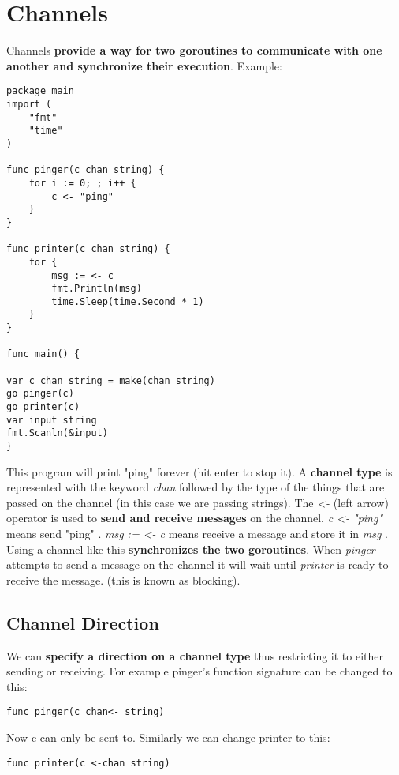 \documentclass[10pt,letterpaper]{report}
\begin{document}
\section{Channels}
Channels \textbf{provide a way for two goroutines to communicate with one another and synchronize their execution}. Example:
\begin{lstlisting}
package main
import (
	"fmt"
	"time"
)

func pinger(c chan string) {
	for i := 0; ; i++ {
		c <- "ping"
	}
}

func printer(c chan string) {
	for {
		msg := <- c
		fmt.Println(msg)
		time.Sleep(time.Second * 1)
	}
}

func main() {

var c chan string = make(chan string)
go pinger(c)
go printer(c)
var input string
fmt.Scanln(&input)
}
\end{lstlisting}
This program will print "ping" forever (hit enter to stop it). A \textbf{channel type} is represented with the keyword \textit{chan} followed by the type of the things that are passed on the channel (in this case we are passing strings). The \textit{<-} (left arrow) operator is used to \textbf{send and receive messages} on the channel. \textit{c <- "ping"} means send "ping" . \textit{msg := <- c} means receive a message and store it in \textit{msg} .\\
Using a channel like this \textbf{synchronizes the two goroutines}. When \textit{pinger} attempts to send a message on the channel it will wait until \textit{printer} is ready to receive the message. (this is known as blocking).
\subsection{Channel Direction}
We can \textbf{specify a direction on a channel type} thus restricting it to either sending or receiving. For example pinger's function signature can be changed to this:
\begin{lstlisting}
func pinger(c chan<- string)
\end{lstlisting}
Now c can only be sent to. Similarly we can change printer to this:
\begin{lstlisting}
func printer(c <-chan string)
\end{lstlisting}
\end{document}
